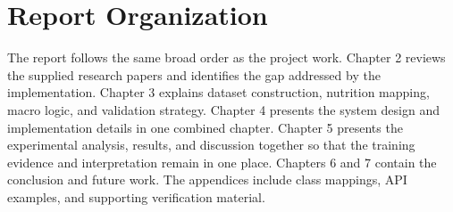 \section{Report Organization}

The report follows the same broad order as the project work. Chapter 2 reviews the supplied research papers and identifies the gap addressed by the implementation. Chapter 3 explains dataset construction, nutrition mapping, macro logic, and validation strategy. Chapter 4 presents the system design and implementation details in one combined chapter. Chapter 5 presents the experimental analysis, results, and discussion together so that the training evidence and interpretation remain in one place. Chapters 6 and 7 contain the conclusion and future work. The appendices include class mappings, API examples, and supporting verification material.
